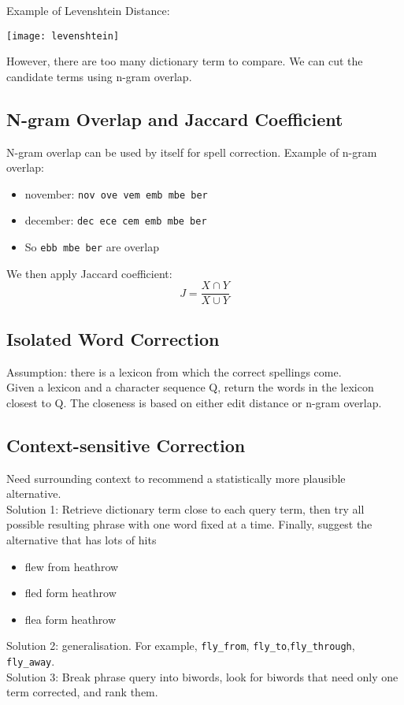 \begin{multicols*}{2}
\noindent Example of Levenshtein Distance:
\begin{center}
\texttt{[image: levenshtein]}
\end{center}

\noindent However, there are too many dictionary term to compare. We can cut the candidate terms using n-gram overlap.

\subsection{N-gram Overlap and Jaccard Coefficient}
\noindent N-gram overlap can be used by itself for spell correction. Example of n-gram overlap:
\begin{itemize}
    \item november: \verb|nov ove vem emb mbe ber|
    \item december: \verb|dec ece cem emb mbe ber|
    \item So \verb|ebb mbe ber| are overlap
\end{itemize}

\noindent We then apply Jaccard coefficient:
$$J=\frac{X\cap Y}{X\cup Y}$$

\subsection{Isolated Word Correction}
\noindent Assumption: there is a lexicon from which the correct spellings come.  \\

\noindent Given a lexicon and a character sequence Q, return the words in the lexicon closest to Q. The closeness is based on either edit distance or n-gram overlap. 

\subsection{Context-sensitive Correction}

\noindent Need surrounding context to recommend a statistically more plausible alternative. \\

\noindent Solution 1: Retrieve dictionary term close to each query term, then try all possible resulting phrase with one word fixed at a time. Finally, suggest the alternative that has lots of hits
\begin{itemize}
    \item flew from heathrow
    \item fled form heathrow
    \item flea form heathrow
\end{itemize}

\noindent Solution 2: generalisation. For example, \verb|fly_from|, \verb|fly_to|,\verb|fly_through|, \verb|fly_away|. \\

\noindent Solution 3: Break phrase query into biwords, look for biwords that need only one term corrected, and rank them. 

\end{multicols*}
